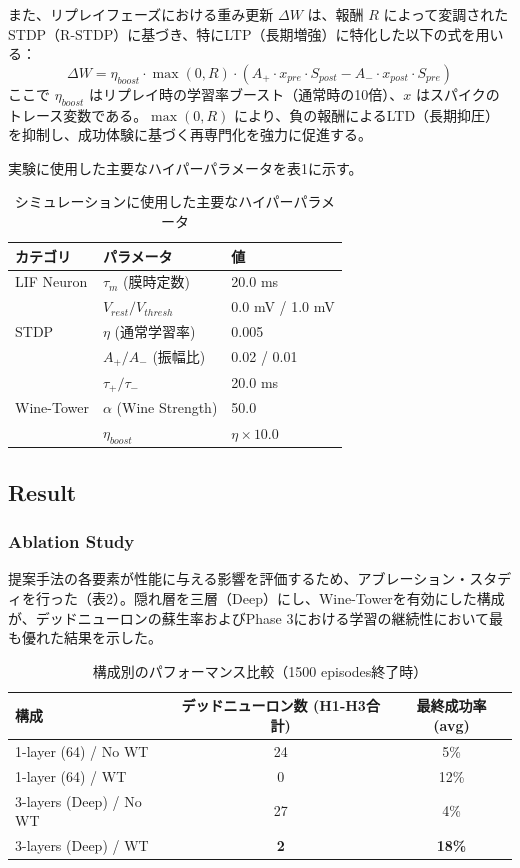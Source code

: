 \documentclass[paper=a4, fontsize=11pt]{jlreq}
\begin{document}
また、リプレイフェーズにおける重み更新 $\Delta W$ は、報酬 $R$ によって変調されたSTDP（R-STDP）に基づき、特にLTP（長期増強）に特化した以下の式を用いる：
\begin{equation}
\Delta W = \eta_{boost} \cdot \max(0, R) \cdot (A_+ \cdot x_{pre} \cdot S_{post} - A_- \cdot x_{post} \cdot S_{pre})
\end{equation}
ここで $\eta_{boost}$ はリプレイ時の学習率ブースト（通常時の10倍）、$x$ はスパイクのトレース変数である。$\max(0, R)$ により、負の報酬によるLTD（長期抑圧）を抑制し、成功体験に基づく再専門化を強力に促進する。

実験に使用した主要なハイパーパラメータを表1に示す。

\begin{table}[h]
\centering
\caption{シミュレーションに使用した主要なハイパーパラメータ}
\begin{tabular}{|l|l|l|}
\hline
カテゴリ & パラメータ & 値 \\ \hline
LIF Neuron & $\tau_m$ (膜時定数) & 20.0 ms \\ \hline
 & $V_{rest} / V_{thresh}$ & 0.0 mV / 1.0 mV \\ \hline
STDP & $\eta$ (通常学習率) & 0.005 \\ \hline
 & $A_+ / A_-$ (振幅比) & 0.02 / 0.01 \\ \hline
 & $\tau_+ / \tau_-$ & 20.0 ms \\ \hline
Wine-Tower & $\alpha$ (Wine Strength) & 50.0 \\ \hline
 & $\eta_{boost}$ & $\eta \times 10.0$ \\ \hline
\end{tabular}
\end{table}

\subsection*{Result}
\subsubsection{Ablation Study}
提案手法の各要素が性能に与える影響を評価するため、アブレーション・スタディを行った（表2）。隠れ層を三層（Deep）にし、Wine-Towerを有効にした構成が、デッドニューロンの蘇生率およびPhase 3における学習の継続性において最も優れた結果を示した。

\begin{table}[h]
\centering
\caption{構成別のパフォーマンス比較（1500 episodes終了時）}
\begin{tabular}{|l|c|c|}
\hline
構成 & デッドニューロン数 (H1-H3合計) & 最終成功率 (avg) \\ \hline
1-layer (64) / No WT & 24 & 5\% \\ \hline
1-layer (64) / WT & 0 & 12\% \\ \hline
3-layers (Deep) / No WT & 27 & 4\% \\ \hline
3-layers (Deep) / WT & \textbf{2} & \textbf{18\%} \\ \hline
\end{tabular}
\end{table}
\end{document}

